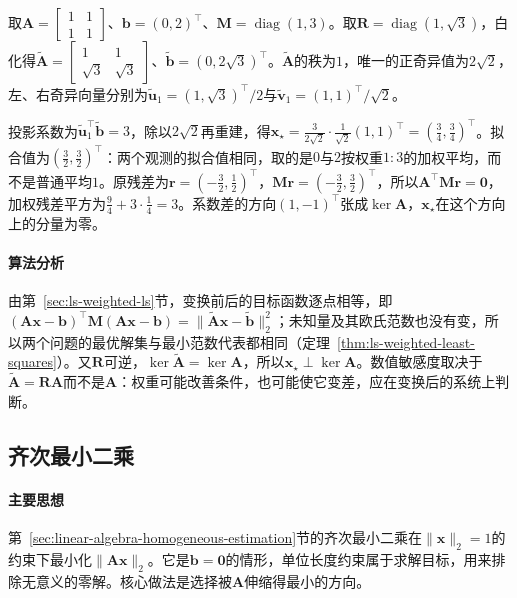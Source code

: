 \begin{example}[秩亏的加权最小二乘]
\label{ex:ls-weighted-svd-rank-deficient}
取$\bm A=\left[\begin{smallmatrix}1&1\\1&1\end{smallmatrix}\right]$、$\bm b=(0,2)^\top$、$\bm M=\operatorname{diag}(1,3)$。取$\bm R=\operatorname{diag}(1,\sqrt3)$，白化得$\widetilde{\bm A}=\left[\begin{smallmatrix}1&1\\\sqrt3&\sqrt3\end{smallmatrix}\right]$、$\widetilde{\bm b}=(0,2\sqrt3)^\top$。$\widetilde{\bm A}$的秩为$1$，唯一的正奇异值为$2\sqrt2$，左、右奇异向量分别为$\tilde{\bm u}_1=(1,\sqrt3)^\top/2$与$\tilde{\bm v}_1=(1,1)^\top/\sqrt2$。

投影系数为$\tilde{\bm u}_1^\top\widetilde{\bm b}=3$，除以$2\sqrt2$再重建，得$\bm x_\star=\tfrac{3}{2\sqrt2}\cdot\tfrac1{\sqrt2}(1,1)^\top=(\tfrac34,\tfrac34)^\top$。拟合值为$(\tfrac32,\tfrac32)^\top$：两个观测的拟合值相同，取的是$0$与$2$按权重$1:3$的加权平均，而不是普通平均$1$。原残差为$\bm r=(-\tfrac32,\tfrac12)^\top$，$\bm M\bm r=(-\tfrac32,\tfrac32)^\top$，所以$\bm A^\top\bm M\bm r=\bm0$，加权残差平方为$\tfrac94+3\cdot\tfrac14=3$。系数差的方向$(1,-1)^\top$张成$\ker\bm A$，$\bm x_\star$在这个方向上的分量为零。
\end{example}

\paragraph{算法分析}
由第~\ref{sec:ls-weighted-ls}节，变换前后的目标函数逐点相等，即$(\bm A\bm x-\bm b)^\top\bm M(\bm A\bm x-\bm b)=\lVert\widetilde{\bm A}\bm x-\widetilde{\bm b}\rVert_2^2$；未知量及其欧氏范数也没有变，所以两个问题的最优解集与最小范数代表都相同（定理~\ref{thm:ls-weighted-least-squares}）。又$\bm R$可逆，$\ker\widetilde{\bm A}=\ker\bm A$，所以$\bm x_\star\perp\ker\bm A$。数值敏感度取决于$\widetilde{\bm A}=\bm R\bm A$而不是$\bm A$：权重可能改善条件，也可能使它变差，应在变换后的系统上判断。

\subsection{齐次最小二乘}
\label{sec:ls-homogeneous-svd-solve}

\paragraph{主要思想}
第~\ref{sec:linear-algebra-homogeneous-estimation}节的齐次最小二乘在$\lVert\bm x\rVert_2=1$的约束下最小化$\lVert\bm A\bm x\rVert_2$。它是$\bm b=\bm0$的情形，单位长度约束属于求解目标，用来排除无意义的零解。核心做法是选择被$\bm A$伸缩得最小的方向。

